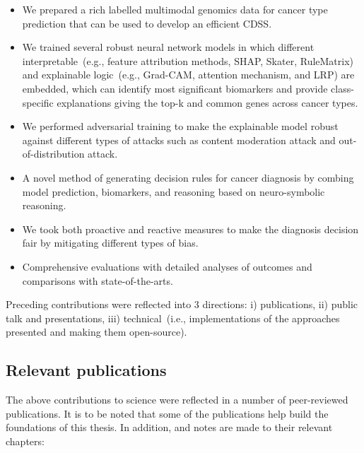 \begin{itemize}[noitemsep]
    \item We prepared a rich labelled multimodal genomics data for cancer type prediction that can be used to develop an efficient CDSS.  
    \item We trained several robust neural network models in which different interpretable~(e.g., feature attribution methods, SHAP, Skater, RuleMatrix) and explainable logic~(e.g., Grad-CAM, attention mechanism, and LRP) are embedded, which can identify most significant biomarkers and provide class-specific explanations giving the top-k and common genes across cancer types.
    \item We performed adversarial training to make the explainable model robust against different types of attacks such as content moderation attack and out-of-distribution attack. 
    \item A novel method of generating decision rules for cancer diagnosis by combing model prediction, biomarkers, and reasoning based on neuro-symbolic reasoning. 
    \item We took both proactive and reactive measures to make the diagnosis decision fair by mitigating different types of bias. 
    \item Comprehensive evaluations with detailed analyses of outcomes and comparisons with state-of-the-arts. 
\end{itemize}

\hspace*{3.5mm} Preceding contributions were reflected into 3 directions: i) publications, ii) public talk and presentations, iii) technical~(i.e., implementations of the approaches presented and making them open-source). %

\subsection{Relevant publications}
The above contributions to science were reflected in a number of peer-reviewed publications. It is to be noted that some of the publications help build the foundations of this thesis. In addition, and notes are made to their relevant chapters: 

